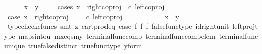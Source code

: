\begin{isabellebody}
\ \ \ \ \isamarkupfalse%
\ {\isachardoublequoteopen}x\ {\isacharequal}{\kern0pt}\ y{\isachardoublequoteclose}\isanewline
\ \ \ \ \isamarkupfalse%
{\isacharparenleft}{\kern0pt}cases\ {\isachardoublequoteopen}x\ {\isacharequal}{\kern0pt}\ {\isacharparenleft}{\kern0pt}right{\isacharunderscore}{\kern0pt}coproj\ {\isasymone}\ {\isacharparenleft}{\kern0pt}{\isasymone}{\isasymCoprod}{\isasymone}{\isacharparenright}{\kern0pt}{\isasymcirc}\isactrlsub c\ left{\isacharunderscore}{\kern0pt}coproj\ {\isasymone}\ {\isasymone}{\isacharparenright}{\kern0pt}{\isachardoublequoteclose}{\isacharparenright}{\kern0pt}\isanewline
\ \ \ \ \ \ \isamarkupfalse%
\ case{}{\isacharcolon}{\kern0pt}\ {\isachardoublequoteopen}x\ {\isacharequal}{\kern0pt}\ right{\isacharunderscore}{\kern0pt}coproj\ {\isasymone}\ {\isacharparenleft}{\kern0pt}{\isasymone}\ {\isasymCoprod}\ {\isasymone}{\isacharparenright}{\kern0pt}\ {\isasymcirc}\isactrlsub c\ left{\isacharunderscore}{\kern0pt}coproj\ {\isasymone}\ {\isasymone}{\isachardoublequoteclose}\isanewline
\ \ \ \ \ \ \isamarkupfalse%
\ \isamarkupfalse%
\ {\isachardoublequoteopen}x\ {\isacharequal}{\kern0pt}\ y{\isachardoublequoteclose}\isanewline
\ \ \ \ \ \ \ \ \isamarkupfalse%
\ {\isacharparenleft}{\kern0pt}typecheck{\isacharunderscore}{\kern0pt}cfuncs{\isacharcomma}{\kern0pt}\ smt\ {\isacharparenleft}{\kern0pt}z{}{\isacharparenright}{\kern0pt}\ cart{\isacharunderscore}{\kern0pt}prod{\isacharunderscore}{\kern0pt}eq{}\ case{}\ f{}\ f{}\ f{}\ false{\isacharunderscore}{\kern0pt}func{\isacharunderscore}{\kern0pt}type\ id{\isacharunderscore}{\kern0pt}right{\isacharunderscore}{\kern0pt}unit{}\ left{\isacharunderscore}{\kern0pt}proj{\isacharunderscore}{\kern0pt}type\ maps{\isacharunderscore}{\kern0pt}into{\isacharunderscore}{\kern0pt}{}u{}\ mx{\isacharunderscore}{\kern0pt}eqs{\isacharunderscore}{\kern0pt}my\ terminal{\isacharunderscore}{\kern0pt}func{\isacharunderscore}{\kern0pt}comp\ terminal{\isacharunderscore}{\kern0pt}func{\isacharunderscore}{\kern0pt}comp{\isacharunderscore}{\kern0pt}elem\ terminal{\isacharunderscore}{\kern0pt}func{\isacharunderscore}{\kern0pt}unique\ true{\isacharunderscore}{\kern0pt}false{\isacharunderscore}{\kern0pt}distinct\ true{\isacharunderscore}{\kern0pt}func{\isacharunderscore}{\kern0pt}type\ y{\isacharunderscore}{\kern0pt}form{\isacharparenright}{\kern0pt}\ \ \ \ \ \ \ \ \isanewline
\ \ \ \ \isamarkupfalse%

\end{isabellebody}
